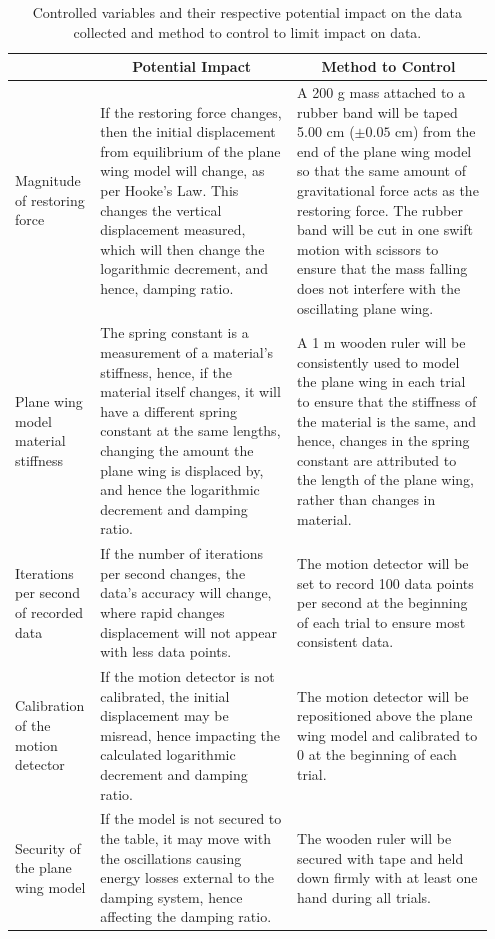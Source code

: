 \documentclass[12pt]{article}
\begin{document}
\begin{table}[H]
\centering
\caption{Controlled variables and their respective potential impact on the data collected and method to control to limit impact on data.}\label{controlled}
\begin{tabular}{|p{0.15\linewidth}|p{0.4\linewidth}|p{0.4\linewidth}|}
\hline
\rowcolor[HTML]{C0C0C0} 
    \multicolumn{1}{|c|}{Variable} 
    & \multicolumn{1}{|c|}{Potential Impact} 
    & \multicolumn{1}{|c|}{Method to Control} \\ 
\hline
    Magnitude of restoring force
    & If the restoring force changes, then the initial displacement from equilibrium of the plane wing model will change, as per Hooke's Law. This changes the vertical displacement measured, which will then change the logarithmic decrement, and hence, damping ratio. & A 200 g mass attached to a rubber band will be taped 5.00 cm ($\pm0.05$ cm) from the end of the plane wing model so that the same amount of gravitational force acts as the restoring force. The rubber band will be cut in one swift motion with scissors to ensure that the mass falling does not interfere with the oscillating plane wing. \\ 
\hline
    Plane wing model material stiffness 
    & The spring constant is a measurement of a material's stiffness, hence, if the material itself changes, it will have a different spring constant at the same lengths, changing the amount the plane wing is displaced by, and hence the logarithmic decrement and damping ratio. & A 1 m wooden ruler will be consistently used to model the plane wing in each trial to ensure that the stiffness of the material is the same, and hence, changes in the spring constant are attributed to the length of the plane wing, rather than changes in material. \\
\hline 
    Iterations per second of recorded data
    & If the number of iterations per second changes, the data's accuracy will change, where rapid changes displacement will not appear with less data points. & The motion detector will be set to record 100 data points per second at the beginning of each trial to ensure most consistent data. \\
\hline
    Calibration of the motion detector
    & If the motion detector is not calibrated, the initial displacement may be misread, hence impacting the calculated logarithmic decrement and damping ratio. & The motion detector will be repositioned above the plane wing model and calibrated to 0 at the beginning of each trial. \\
\hline
    Security of the plane wing model
    & If the model is not secured to the table, it may move with the oscillations causing energy losses external to the damping system, hence affecting the damping ratio. & The wooden ruler will be secured with tape and held down firmly with at least one hand during all trials. \\
\hline
\end{tabular}
\end{table}
\end{document}
